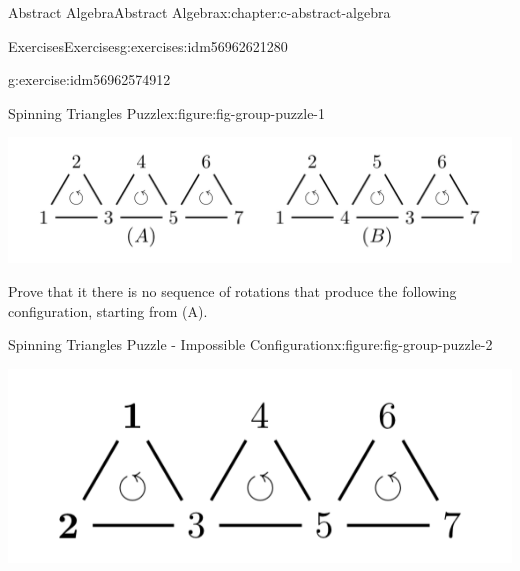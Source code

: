 \documentclass[twoside,10pt,]{book}
\numberwithin{equation}{section}
\begin{document}
\begin{chapterptx}{Abstract Algebra}{}{Abstract Algebra}{}{}{x:chapter:c-abstract-algebra}
\begin{exercises-section}{Exercises}{}{Exercises}{}{}{g:exercises:idm56962621280}
\begin{divisionexercise}{7}{}{}{g:exercise:idm56962574912}
\begin{figureptx}{Spinning Triangles Puzzle}{x:figure:fig-group-puzzle-1}{}
\begin{image}{0}{1}{0}%
\includegraphics[width=\linewidth]{images/fig-group-puzzle-1.png}
\end{image}%
\tcblower
\end{figureptx}%
Prove that it there is no sequence of rotations that produce the following configuration, starting from (A).%
\begin{figureptx}{Spinning Triangles Puzzle - Impossible Configuration}{x:figure:fig-group-puzzle-2}{}%
\begin{image}{0}{1}{0}%
\includegraphics[width=\linewidth]{images/fig-group-puzzle-2.png}
\end{image}%
\tcblower
\end{figureptx}%
\end{divisionexercise}%
\end{exercises-section}
\end{chapterptx}
%
%
\typeout{************************************************}
\typeout{************************************************}
%
\end{document}

